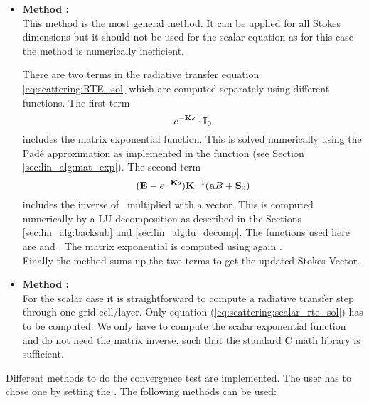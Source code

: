 \begin{itemize}
\item {\bf Method :}\\
This method is the most general method. It can be applied for all
Stokes dimensions but it should not be used for the scalar equation as
for this case the method is numerically inefficient. 

There are two terms in the radiative transfer equation
\ref{eq:scattering:RTE_sol} which are
computed separately using different functions. The first term 
\begin{equation}
 e^{-{\bf K} s}\cdot{\bf I}_0
\end{equation}
includes the matrix exponential function. This is solved numerically
using the Pad\'e approximation as implemented in the function 
 (see Section \ref{sec:lin_alg:mat_exp}).
The second term 
\begin{equation}
({\bf E} - e^{-{\bf K}
    s}) {\bf K}^{-1} ({\bf a} B + {\bf S}_0)
\end{equation}
includes the inverse of \ExtMat\ multiplied with a vector. This is
computed numerically by a LU decomposition as described in the
Sections \ref{sec:lin_alg:backsub} and
\ref{sec:lin_alg:lu_decomp}. The functions used here are
 and . The matrix exponential is
computed using again .\\
Finally the method sums up the two terms to get the updated Stokes Vector. 
 
\item {\bf Method :}\\
For the scalar case it is straightforward to compute a radiative
transfer step through one grid cell/layer. Only equation
(\ref{eq:scattering:scalar_rte_sol}) has to be computed. We only
have to compute the scalar exponential function and do not need the
matrix inverse, such that the standard C math library is sufficient.
\end{itemize}


\label{sec:scattering:conv_method}

Different methods to do the convergence test are implemented. The user
has to chose one by setting the
. The following methods can be
used:

